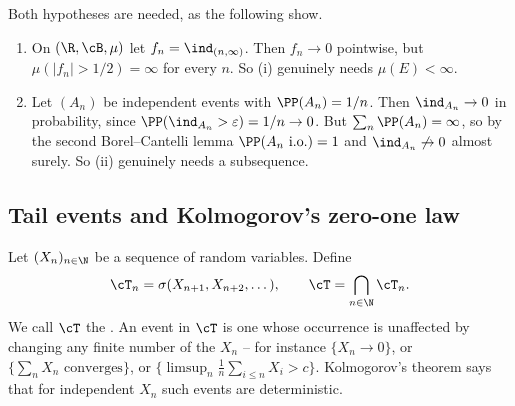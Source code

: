 Both hypotheses are needed, as the following show.

\begin{example}
	\begin{enumerate}[label=(\roman*)]
		\item On $(\R, \cB, \mu)$ let $f_n = \ind_{(n,\infty)}$. Then $f_n \to 0$ pointwise, but $\mu(|f_n| > 1/2) = \infty$ for every $n$. So (i) genuinely needs $\mu(E)<\infty$.
		\item Let $(A_n)$ be independent events with $\PP(A_n)= 1/n$. Then $\ind_{A_n}\to 0$ in probability, since $\PP(\ind_{A_n} > \varepsilon) = 1/n \to 0$. But $\sum_n \PP(A_n) = \infty$, so by the second Borel--Cantelli lemma $\PP(A_n \text{ i.o.}) = 1$ and $\ind_{A_n} \not\to 0$ almost surely. So (ii) genuinely needs a subsequence.
	\end{enumerate}
\end{example}

\subsection{Tail events and Kolmogorov's zero-one law}

Let $(X_n)_{n \in \N}$ be a sequence of random variables. Define
$$
\cT_n = \sigma(X_{n+1}, X_{n+2}, \dots), \qquad \cT = \bigcap_{n \in \N}\cT_n.
$$
We call $\cT$ the . An event in $\cT$ is one whose occurrence is unaffected by changing any finite number of the $X_n$ -- for instance $\{X_n \to 0\}$, or $\{\sum_n X_n \text{ converges}\}$, or $\{\limsup_n \frac1n\sum_{i\leq n} X_i > c\}$. Kolmogorov's theorem says that for independent $X_n$ such events are deterministic.

